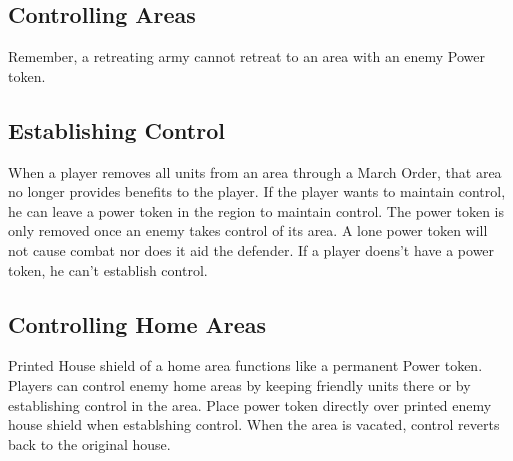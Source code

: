 \documentclass[12pt]{article}
\begin{document}
\begin{multicols*}{2}
\section*{Controlling Areas}
Remember, a retreating army cannot retreat to an area with an enemy Power token.
\subsection*{Establishing Control}
When a player removes all units from an area through a March Order, that area no longer provides benefits to the player. If the player wants to maintain control, he can leave a power token in the region to maintain control. The power token is only removed once an enemy takes control of its area. A lone power token will not cause combat nor does it aid the defender. If a player doens't have a power token, he can't establish control.
\subsection*{Controlling Home Areas}
Printed House shield of a home area functions like a permanent Power token. Players can control enemy home areas by keeping friendly units there or by establishing control in the area. Place power token directly over printed enemy house shield when establshing control. When the area is vacated, control reverts back to the original house.

\end{multicols*}
\end{document}
